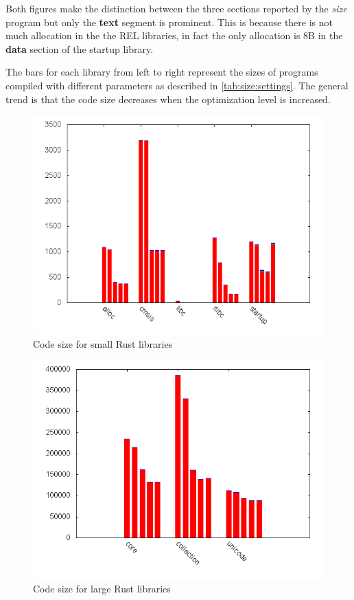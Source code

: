 Both figures make the distinction between the three sections reported by the \emph{size} program but only the \textbf{text} segment is prominent.
This is because there is not much allocation in the the REL libraries, in fact the only allocation is 8B in the \textbf{data} section of the startup library.

The bars for each library from left to right represent the sizes of programs compiled with different parameters as described in \autoref{tab:size:settings}.
The general trend is that the code size decreases when the optimization level is increased.

\begin{figure}[H]
  \begin{center}
    \includegraphics[scale=0.3]{results/plots/size/lib/small/size.png}
  \end{center}
  \caption{Code size for small Rust libraries}
  \label{fig:size:lib:small}
\end{figure}
\begin{figure}[H]
  \begin{center}
    \includegraphics[scale=0.3]{results/plots/size/lib/large/size.png}
  \end{center}
  \caption{Code size for large Rust libraries}
  \label{fig:size:lib:large}
\end{figure}

